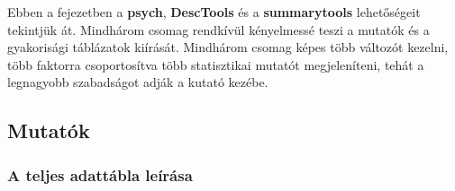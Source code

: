 \documentclass[
]{book}
\begin{document}
Ebben a fejezetben a \textbf{psych}, \textbf{DescTools} és a \textbf{summarytools} lehetőségeit tekintjük át. Mindhárom csomag rendkívül kényelmessé teszi a mutatók és a gyakorisági táblázatok kiírását. Mindhárom csomag képes több változót kezelni, több faktorra csoportosítva több statisztikai mutatót megjeleníteni, tehát a legnagyobb szabadságot adják a kutató kezébe.

\hypertarget{mutatuxf3k-1}{%
\subsection{Mutatók}\label{mutatuxf3k-1}}

\hypertarget{a-teljes-adattuxe1bla-leuxedruxe1sa}{%
\subsubsection{A teljes adattábla leírása}\label{a-teljes-adattuxe1bla-leuxedruxe1sa}}
\end{document}
